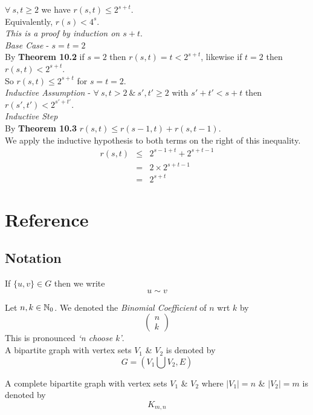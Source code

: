 \documentclass[11pt,a4paper]{article}
\begin{document}
$\forall\ s,t\geq2$ we have $r(s,t)\leq2^{s+t}$.\\
Equivalently, $r(s)<4^s$.\\

\textit{This is a proof by induction on $s+t$}.\\
\textit{Base Case} - $s=t=2$\\
By \textbf{Theorem 10.2} if $s=2$ then $r(s,t)=t<2^{s+t}$, likewise if $t=2$ then $r(s,t)<2^{s+t}$.\\
So $r(s,t)\leq2^{s+t}$ for $s=t=2$.\\
\textit{Inductive Assumption} - $\forall\ s,t>2\ \&\ s',t'\geq2$ with $s'+t'<s+t$ then $r(s',t')<2^{s'+t'}$.\\
\textit{Inductive Step}\\
By \textbf{Theorem 10.3} $r(s,t)\leq r(s-1,t)+r(s,t-1)$.\\
We apply the inductive hypothesis to both terms on the right of this inequality.
\[\begin{array}{rcl}
r(s,t)&\leq&2^{s-1+t}+2^{s+t-1}\\
&=&2\times2^{s+t-1}\\
&=&2^{s+t}
\end{array}\]


\newpage
\setcounter{section}{-1}
\section{Reference}

\subsection{Notation}

If $\{u,v\}\in G$ then we write $$u\sim v$$

Let $n,k\in\mathbb{N}_0$. We denoted the \textit{Binomial Coefficient} of $n$ wrt $k$ by
$$\begin{pmatrix}n\\k\end{pmatrix}$$
This is pronounced \textit{`n choose k'}.\\

A bipartite graph with vertex sets $V_1$ \& $V_2$ is denoted by
$$G=(V_1\bigcup V_2,E)$$

A complete bipartite graph with vertex sets $V_1$ \& $V_2$ where $|V_1|=n$ \& $|V_2|=m$ is denoted by
$$K_{m,n}$$
\end{document}
